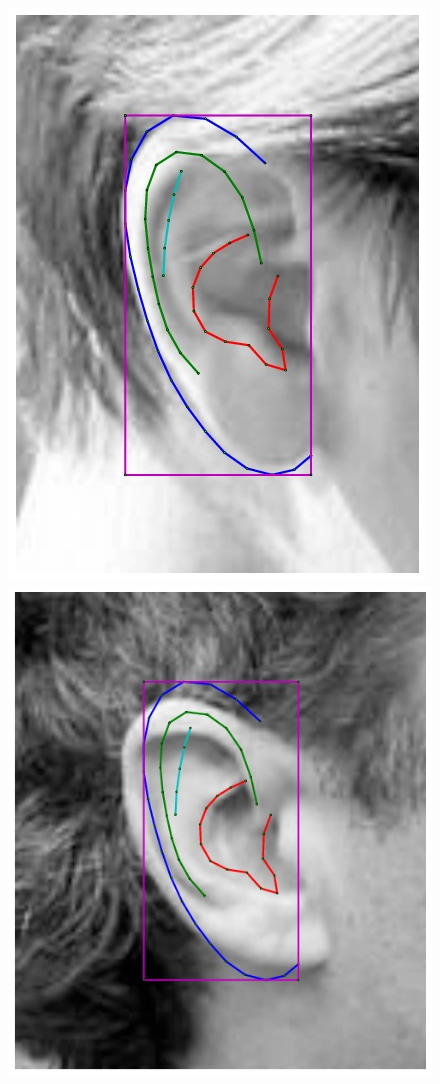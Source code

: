 \begin{figure}
    \hfill
    \includegraphics[height=\flowhh]{resources/Ear_Deformable_Model/fittings/initial_0023}
    \hfill
    \includegraphics[height=\flowhh]{resources/Ear_Deformable_Model/fittings/initial_0015}

\end{figure}
